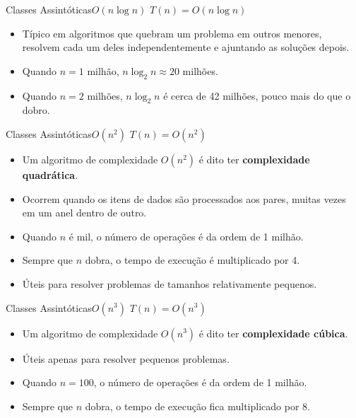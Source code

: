 \documentclass[aspectratio=169]{beamer}
\begin{document}

\begin{frame}{Classes Assintóticas}{$O(n \log n)$}
$T(n) = O(n \log n)$
\begin{itemize}
 \item Típico em algoritmos que quebram um problema em outros menores, resolvem cada um deles independentemente e ajuntando as soluções depois.
 \item Quando $n=1$ milhão, $n\log_2 n \approx 20$ milhões.
 \item Quando $n=2$ milhões, $n\log_2 n$ é cerca de 42 milhões, pouco mais do que o dobro.
 \end{itemize}
\end{frame}



\begin{frame}{Classes Assintóticas}{$O(n^2)$}
$T(n) = O(n^2)$
\begin{itemize}
 \item Um algoritmo de complexidade $O(n^2)$ é dito ter {\bf complexidade quadrática}.
 \item Ocorrem quando os itens de dados são processados aos pares, muitas vezes em um anel dentro de outro.
 \item Quando $n$ é mil, o número de operações é da ordem de 1 milhão.
 \item Sempre que $n$ dobra, o tempo de execução é multiplicado por 4.
 \item Úteis para resolver problemas de tamanhos relativamente pequenos.
 \end{itemize}
\end{frame}


\begin{frame}{Classes Assintóticas}{$O(n^3)$}
$T(n) = O(n^3)$
\begin{itemize}
 \item Um algoritmo de complexidade $O(n^3)$ é dito ter {\bf complexidade cúbica}.
 \item Úteis apenas para resolver pequenos problemas.
 \item Quando $n=100$, o número de operações é da ordem de 1 milhão.
 \item Sempre que $n$ dobra, o tempo de execução fica multiplicado por 8.
 \end{itemize}
\end{frame}
\end{document}
